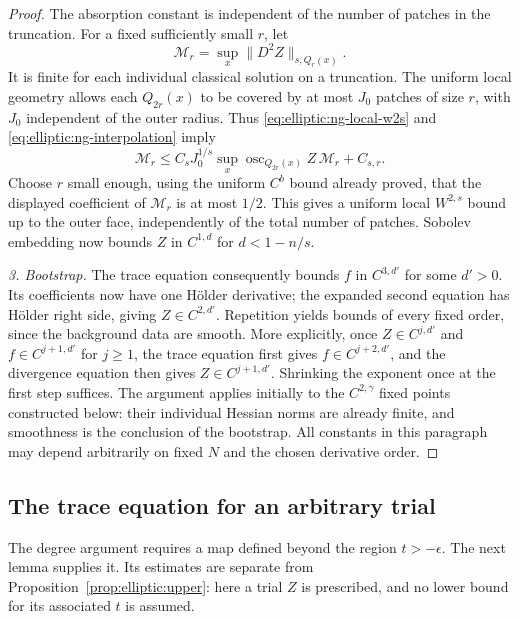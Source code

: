 \begin{proof}
The absorption constant is independent of the number of patches in
the truncation.  For a fixed sufficiently small
$r$, let
\[
 \mathcal M_r=\sup_x\|D^2Z\|_{s,Q_r(x)}.
\]
It is finite for each individual classical solution on a truncation.
The uniform local geometry allows each $Q_{2r}(x)$ to be covered
by at most $J_0$ patches of size $r$, with $J_0$ independent of the
outer radius.  Thus \eqref{eq:elliptic:ng-local-w2s} and
\eqref{eq:elliptic:ng-interpolation} imply
\[
 \mathcal M_r
 \le C_s J_0^{1/s}
       \sup_x\operatorname{osc}_{Q_{2r}(x)}Z\,\mathcal M_r
       +C_{s,r}.
\]
Choose $r$ small enough, using the uniform $C^b$ bound already
proved, that the displayed coefficient of $\mathcal M_r$ is at
most $1/2$.  This gives a uniform local $W^{2,s}$ bound up to the
outer face, independently of the total number of patches.  Sobolev
embedding now bounds $Z$ in $C^{1,d}$ for $d<1-n/s$.

\medskip\noindent\emph{3. Bootstrap.}
The trace equation consequently bounds $f$ in $C^{3,d'}$ for some
$d'>0$.  Its coefficients now have one H\"older derivative; the
expanded second equation has H\"older right side, giving
$Z\in C^{2,d'}$.  Repetition yields bounds of every fixed order,
since the background data are smooth.  More explicitly, once
$Z\in C^{j,d'}$ and $f\in C^{j+1,d'}$ for $j\ge1$, the trace
equation first gives $f\in C^{j+2,d'}$, and the divergence equation
then gives $Z\in C^{j+1,d'}$.  Shrinking the exponent once at the
first step suffices.  The argument applies initially to the
$C^{2,\gamma}$ fixed points constructed below: their individual
Hessian norms are already finite, and smoothness is the conclusion
of the bootstrap.  All constants in this paragraph may depend
arbitrarily on fixed $N$ and the chosen derivative order.

\end{proof}

\subsection{The trace equation for an arbitrary trial}

The degree argument requires a map defined beyond the region $t>-\epsilon$.
The next lemma supplies it.  Its estimates are separate from
Proposition~\ref{prop:elliptic:upper}: here a trial $Z$ is prescribed,
and no lower bound for its associated $t$ is assumed.

